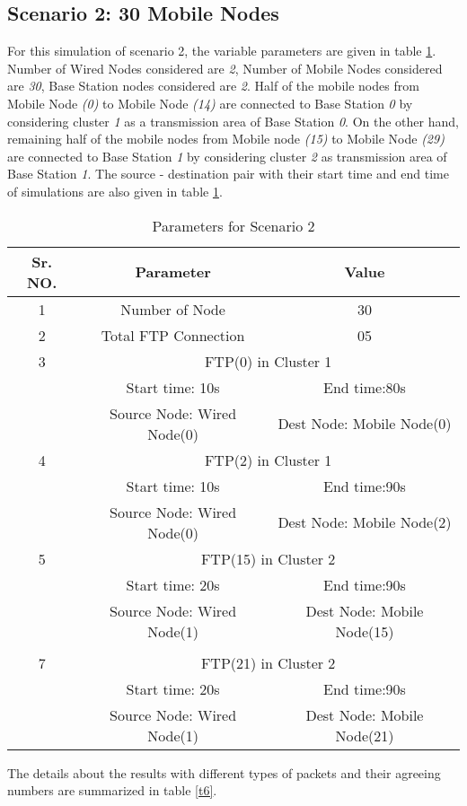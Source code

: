 \documentclass[3p,times]{elsarticle}
\begin{document}
\subsection{Scenario 2: 30 Mobile Nodes}
For this simulation of scenario 2, the variable parameters are given in table \ref {t5}. Number of Wired Nodes considered are \emph{2}, Number of Mobile Nodes considered are \emph{30}, Base Station nodes considered are \emph{2}. Half of the mobile nodes from Mobile Node \emph{(0)} to Mobile Node \emph{(14)} are connected to Base Station \emph{0} by considering cluster \emph{1} as a transmission area of Base Station \emph{0}. On the other hand, remaining half of the mobile nodes from Mobile node \emph{(15)} to Mobile Node \emph{(29)} are connected to  Base Station \emph{1} by considering cluster \emph{2} as transmission area of Base Station \emph{1}. The source - destination pair with their start time and end time of simulations are also given in table \ref {t5}.
\begin{table}[t]
\centering
\caption{Parameters for Scenario 2}
\begin{tabular}{|c|c|c|}
\hline
Sr. NO. & Parameter & Value \\
\hline
1 & Number of Node & 30 \\
2& Total FTP Connection & 05 \\
\hline
3 & \multicolumn{2}{|c|}{ FTP(0) in Cluster 1} \\
 & Start time: 10s &  End time:80s\\
 & Source Node: Wired Node(0) & Dest Node: Mobile Node(0) \\
\hline
4 & \multicolumn{2}{|c|}{ FTP(2) in Cluster 1} \\
 & Start time: 10s &  End time:90s\\
 & Source Node: Wired Node(0) & Dest Node: Mobile Node(2) \\
\hline
5 & \multicolumn{2}{|c|}{ FTP(15) in Cluster 2} \\
 & Start time: 20s &  End time:90s\\
 & Source Node: Wired Node(1) & Dest Node: Mobile Node(15) \\
\hline
 &  &  \\
\hline
7 & \multicolumn{2}{|c|}{ FTP(21) in Cluster 2} \\
 & Start time: 20s &  End time:90s\\
 & Source Node: Wired Node(1) & Dest Node: Mobile Node(21) \\
\hline
\end{tabular}
\label{t5}
\end{table}
The details about the results with different types of packets and their agreeing numbers are summarized in table \ref {t6}.
\end{document}
